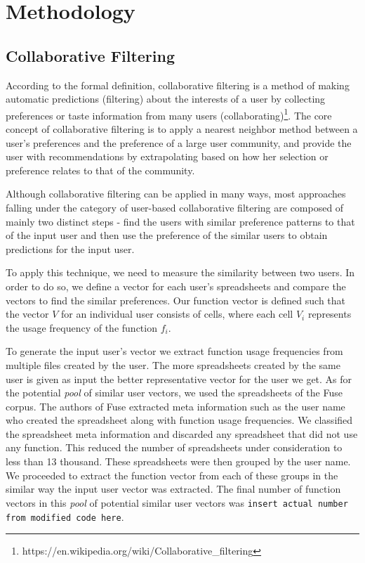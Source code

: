 \documentclass[conference]{IEEEtran}
\begin{document}
\section{Methodology}

\subsection{Collaborative Filtering}
According to the formal definition, collaborative filtering is a method of making automatic predictions (filtering) about the interests of a user by collecting preferences or taste information from many users (collaborating)\footnote{https://en.wikipedia.org/wiki/Collaborative\_filtering}. The core concept of collaborative filtering is to apply a nearest neighbor method between a user's preferences and the preference of a large user community, and provide the user with recommendations by extrapolating based on how her selection or preference relates to that of the community.

Although collaborative filtering can be applied in many ways, most approaches falling under the category of user-based collaborative filtering are composed of mainly two distinct steps - find the users with similar preference patterns to that of the input user and then use the preference of the similar users to obtain predictions for the input user.

To apply this technique, we need to measure the similarity between two users. In order to do so, we define a vector for each user's spreadsheets and compare the vectors to find the similar preferences. Our function vector is defined such that the vector $V$ for an individual user consists of cells, where each cell $V_i$ represents the usage frequency of the function $f_i$.

To generate the input user's vector we extract function usage frequencies from multiple files created by the user. The more spreadsheets created by the same user is given as input the better representative vector for the user we get. As for the potential \textit{pool} of similar user vectors, we used the spreadsheets of the Fuse corpus. The authors of Fuse extracted meta information such as the user name who created the spreadsheet along with function usage frequencies. We classified the spreadsheet meta information and discarded any spreadsheet that did not use any function. This reduced the number of spreadsheets under consideration to less than 13 thousand. These spreadsheets were then grouped by the user name. We proceeded to extract the function vector from each of these groups in the similar way the input user vector was extracted. The final number of function vectors in this \textit{pool} of potential similar user vectors was \texttt{insert actual number from modified code here}.
\end{document}
